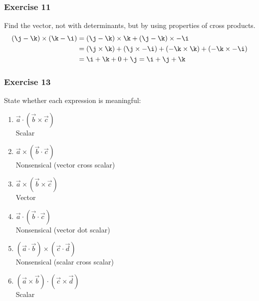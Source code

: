 \documentclass{math}
\begin{document}
\subsubsection*{Exercise 11}
Find the vector, not with determinants, but by using properties of cross
products.
\begin{align*}
  (\j-\k)\times(\k-\i) &= (\j-\k)\times\k+(\j-\k)\times-\i \\
  &= (\j\times\k)+(\j\times-\i)+(-\k\times\k)+(-\k\times-\i) \\
  &= \i+\k+0+\j = \i+\j+\k
\end{align*}

\subsubsection*{Exercise 13}
State whether each expression is meaningful:
\begin{enumerate}
  \item \( \vec{a}\cdot(\vec{b}\times\vec{c}) \) \\
  Scalar
  \item \( \vec{a}\times(\vec{b}\cdot\vec{c}) \) \\
  Nonsensical (vector cross scalar)
  \item \( \vec{a}\times(\vec{b}\times\vec{c}) \) \\
  Vector
  \item \( \vec{a}\cdot(\vec{b}\cdot\vec{c}) \) \\
  Nonsensical (vector dot scalar)
  \item \( (\vec{a}\cdot\vec{b})\times(\vec{c}\cdot\vec{d}) \) \\
  Nonsensical (scalar cross scalar)
  \item \( (\vec{a}\times\vec{b})\cdot(\vec{c}\times\vec{d}) \) \\
  Scalar
\end{enumerate}
\end{document}
